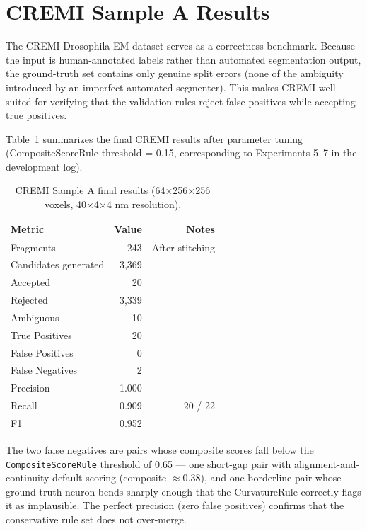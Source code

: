 \section{CREMI Sample A Results}

The CREMI Drosophila EM dataset serves as a correctness benchmark. Because the
input is human-annotated labels rather than automated segmentation output, the
ground-truth set contains only genuine split errors (none of the ambiguity introduced by
an imperfect automated segmenter). This makes CREMI well-suited for verifying
that the validation rules reject false positives while accepting true positives.

Table~\ref{tab:cremi} summarizes the final CREMI results after parameter tuning
(CompositeScoreRule threshold = 0.15, corresponding to Experiments 5--7 in the
development log).

\begin{table}[H]
\centering
\caption{CREMI Sample A final results (64$\times$256$\times$256 voxels, 40$\times$4$\times$4 nm resolution).}
\label{tab:cremi}
\begin{tabular}{@{}lrr@{}}
\toprule
Metric & Value & Notes \\
\midrule
Fragments & 243 & After stitching \\
Candidates generated & 3{,}369 & \\
Accepted & 20 & \\
Rejected & 3{,}339 & \\
Ambiguous & 10 & \\
True Positives & 20 & \\
False Positives & 0 & \\
False Negatives & 2 & \\
Precision & 1.000 & \\
Recall & 0.909 & 20 / 22 \\
F1 & 0.952 & \\
\bottomrule
\end{tabular}
\end{table}

The two false negatives are pairs whose composite scores fall below the
\texttt{CompositeScoreRule} threshold of 0.65 --- one short-gap pair with
alignment-and-continuity-default scoring (composite $\approx 0.38$), and one
borderline pair whose ground-truth neuron bends sharply enough that the
CurvatureRule correctly flags it as implausible. The perfect precision (zero
false positives) confirms that the conservative rule set does not over-merge.

